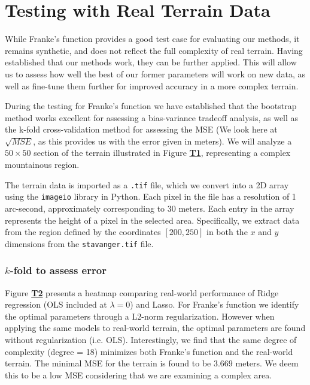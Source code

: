 \documentclass{article}
\begin{document}

\section*{Testing with Real Terrain Data}

\begin{multicols}{2}
While Franke's function provides a good test case for evaluating our methods, it remains synthetic, and does not reflect the full complexity of real terrain. Having established that our methods work, they can be further applied. This will allow us to assess how well the best of our former parameters will work on new data, as well as fine-tune them further for improved accuracy in a more complex terrain. 

During the testing for Franke's function we have established that the bootstrap method works excellent for assessing a bias-variance tradeoff analysis, as well as the k-fold cross-validation method for assessing the MSE (We look here at $\sqrt{MSE}$, as this provides us with the error given in meters). We will analyze a $50\times 50$ section of the terrain illustrated in Figure \hyperref[fig:T1]{\textbf{T1}}, representing a complex mountainous region.

The terrain data is imported as a \texttt{.tif} file, which we convert into a 2D array using the \texttt{imageio} library in Python. Each pixel in the file has a resolution of 1 arc-second, approximately corresponding to 30 meters. Each entry in the array represents the height of a pixel in the selected area. Specifically, we extract data from the region defined by the coordinates $[200, 250]$ in both the $x$ and $y$ dimensions from the \texttt{stavanger.tif} file.

\subsubsection*{$k$-fold to assess error}
Figure \hyperref[fig:T2]{\textbf{T2}} presents a heatmap comparing real-world performance of Ridge regression (OLS included at $\lambda = 0$) and Lasso. For Franke's function we identify the optimal parameters through a L2-norm regularization. However when applying the same models to real-world terrain, the optimal parameters are found without regularization (i.e. OLS). Interestingly, we find that the same degree of complexity (degree = 18) minimizes both Franke's function and the real-world terrain. The minimal MSE for the terrain is found to be $3.669$ meters. We deem this to be a low MSE considering that we are examining a complex area. 


\end{multicols}
\end{document}
